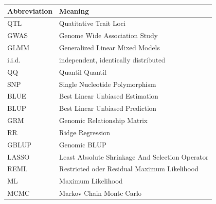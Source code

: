 \documentclass[]{book}
\begin{document}
\begin{tabular}{l|l}
\hline
Abbreviation & Meaning\\
\hline
QTL & Quatitative Trait Loci\\
\hline
GWAS & Genome Wide Association Study\\
\hline
GLMM & Generalized Linear Mixed Models\\
\hline
i.i.d. & independent, identically distributed\\
\hline
QQ & Quantil Quantil\\
\hline
SNP & Single Nucleotide Polymorphism\\
\hline
BLUE & Best Linear Unbiased Estimation\\
\hline
BLUP & Best Linear Unbiased Prediction\\
\hline
GRM & Genomic Relationship Matrix\\
\hline
RR & Ridge Regression\\
\hline
GBLUP & Genomic BLUP\\
\hline
LASSO & Least Absolute Shrinkage And Selection Operator\\
\hline
REML & Restricted oder Residual Maximum Likelihood\\
\hline
ML & Maximum Likelihood\\
\hline
MCMC & Markov Chain Monte Carlo\\
\hline
\end{tabular}


\end{document}
